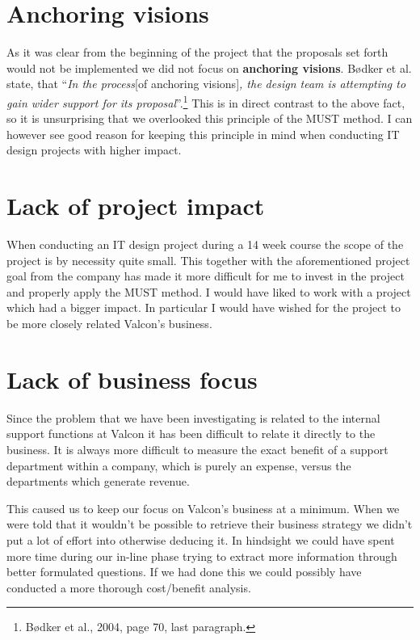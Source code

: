 \section*{Anchoring visions}
As it was clear from the beginning of the project that the proposals set forth would not be implemented we did not focus on \textbf{anchoring visions}.
Bødker et al. state, that ``\emph{In the process}[of anchoring visions]\emph{, the design team is attempting to gain wider support for its proposal}''.\footnote{Bødker et al., 2004, page 70, last paragraph.}
This is in direct contrast to the above fact, so it is unsurprising that we overlooked this principle of the MUST method.
I can however see good reason for keeping this principle in mind when conducting IT design projects with higher impact.

\section*{Lack of project impact}
When conducting an IT design project during a 14 week course the scope of the project is by necessity quite small.
This together with the aforementioned project goal from the company has made it more difficult for me to invest in the project and properly apply the MUST method. 
I would have liked to work with a project which had a bigger impact.
In particular I would have wished for the project to be more closely related Valcon's business.

\section*{Lack of business focus}
Since the problem that we have been investigating is related to the internal support functions at Valcon it has been difficult to relate it directly to the business.
It is always more difficult to measure the exact benefit of a support department within a company, which is purely an expense, versus the departments which generate revenue.

This caused us to keep our focus on Valcon's business at a minimum.
When we were told that it wouldn't be possible to retrieve their business strategy we didn't put a lot of effort into otherwise deducing it.
In hindsight we could have spent more time during our in-line phase trying to extract more information through better formulated questions.
If we had done this we could possibly have conducted a more thorough cost/benefit analysis.

